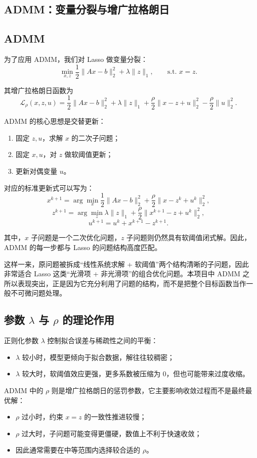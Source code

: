 \documentclass[12pt,a4paper]{ctexart}
\begin{document}
\subsection{ADMM：变量分裂与增广拉格朗日}
\subsection{ADMM}
为了应用 ADMM，我们对 Lasso 做变量分裂：
\[
\min_{x,z}\frac{1}{2}\|Ax-b\|_2^2+\lambda\|z\|_1,
\qquad \text{s.t. } x=z.
\]

其增广拉格朗日函数为
\[
\mathcal{L}_\rho(x,z,u)
=
\frac{1}{2}\|Ax-b\|_2^2+\lambda\|z\|_1
+\frac{\rho}{2}\|x-z+u\|_2^2-\frac{\rho}{2}\|u\|_2^2.
\]

ADMM 的核心思想是交替更新：
\begin{enumerate}[label=\arabic*.]
    \item 固定 $z,u$，求解 $x$ 的二次子问题；
    \item 固定 $x,u$，对 $z$ 做软阈值更新；
    \item 更新对偶变量 $u$。
\end{enumerate}

对应的标准更新式可以写为：
\[
x^{k+1}
=
\arg\min_x
\frac{1}{2}\|Ax-b\|_2^2
+\frac{\rho}{2}\|x-z^k+u^k\|_2^2,
\]
\[
z^{k+1}
=
\arg\min_z
\lambda\|z\|_1
+\frac{\rho}{2}\|x^{k+1}-z+u^k\|_2^2,
\]
\[
u^{k+1}=u^k+x^{k+1}-z^{k+1}.
\]

其中，$x$ 子问题是一个二次优化问题，$z$ 子问题则仍然具有软阈值闭式解。因此，ADMM 的每一步都与 Lasso 的问题结构高度匹配。

这样一来，原问题被拆成“线性系统求解 + 软阈值”两个结构清晰的子问题，因此非常适合 Lasso 这类“光滑项 + 非光滑项”的组合优化问题。本项目中 ADMM 之所以表现突出，正是因为它充分利用了问题的结构，而不是把整个目标函数当作一般不可微问题处理。

\subsection{参数 $\lambda$ 与 $\rho$ 的理论作用}
正则化参数 $\lambda$ 控制拟合误差与稀疏性之间的平衡：
\begin{itemize}[leftmargin=2em]
    \item $\lambda$ 较小时，模型更倾向于拟合数据，解往往较稠密；
    \item $\lambda$ 较大时，软阈值效应更强，更多系数被压缩为 0，但也可能带来过度收缩。
\end{itemize}

ADMM 中的 $\rho$ 则是增广拉格朗日的惩罚参数，它主要影响收敛过程而不是最终最优解：
\begin{itemize}[leftmargin=2em]
    \item $\rho$ 过小时，约束 $x=z$ 的一致性推进较慢；
    \item $\rho$ 过大时，子问题可能变得更僵硬，数值上不利于快速收敛；
    \item 因此通常需要在中等范围内选择较合适的 $\rho$。
\end{itemize}
\end{document}
